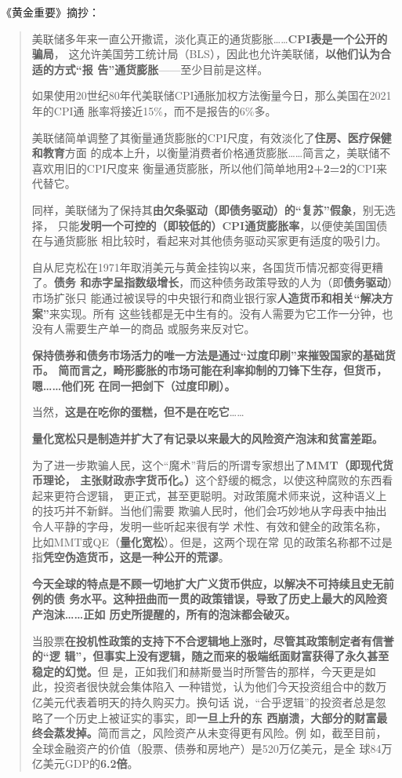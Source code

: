 《黄金重要》摘抄：
\begin{quotation}
  美联储多年来一直公开撒谎，淡化真正的通货膨胀……\textbf{CPI表是一个公开的骗局}，
  这允许美国劳工统计局（BLS），因此也允许美联储，\textbf{以他们认为合适的方式“报
    告”通货膨胀}——至少目前是这样。

  如果使用20世纪80年代美联储CPI通胀加权方法衡量今日，那么美国在2021年的CPI通
  胀率将接近15\%，而不是报告的6\%多。

  美联储简单调整了其衡量通货膨胀的CPI尺度，有效淡化了\textbf{住房、医疗保健和教育}方面
  的成本上升，以衡量消费者价格通货膨胀……简言之，美联储不喜欢用旧的CPI尺度来
  衡量通货膨胀，所以他们简单地用\textbf{2+2=2}的CPI来代替它。

  同样，美联储为了保持其\textbf{由欠条驱动（即债务驱动）的“复苏”假象}，别无选择，
  只能\textbf{发明一个可控的（即较低的）CPI通货膨胀率}，以便使美国国债在与通货膨胀
  相比较时，看起来对其他债务驱动买家更有适度的吸引力。

  自从尼克松在1971年取消美元与黄金挂钩以来，各国货币情况都变得更糟了。\textbf{债务
    和赤字呈指数级增长}，而这种债务政策导致的人为（即\textbf{债务驱动}）市场扩张只
  能通过被误导的中央银行和商业银行家\textbf{人造货币和相关“解决方案”}来实现。所有
  这些钱都是无中生有的。没有人需要为它工作一分钟，也没有人需要生产单一的商品
  或服务来反对它。

  \textbf{保持债券和债务市场活力的唯一方法是通过“过度印刷”来摧毁国家的基础货币。
    简而言之，畸形膨胀的市场可能在利率抑制的刀锋下生存，但货币，嗯……他们死
    在同一把剑下（过度印刷）。}

  当然，\textbf{这是在吃你的蛋糕，但不是在吃它}……


  \textbf{量化宽松只是制造并扩大了有记录以来最大的风险资产泡沫和贫富差距。}

  为了进一步欺骗人民，这个“魔术”背后的所谓专家想出了\textbf{MMT（即现代货币理论，
    主张财政赤字货币化。）}这个舒缓的概念，以使这种腐败的东西看起来更符合逻辑，
  更正式，甚至更聪明。对政策魔术师来说，这种语义上的技巧并不新鲜。当他们需要
  欺骗人民时，他们会巧妙地从字母表中抽出令人平静的字母，发明一些听起来很有学
  术性、有效和健全的政策名称，比如MMT或QE（\textbf{量化宽松}）。但是，这两个现在常
  见的政策名称都不过是指\textbf{凭空伪造货币，这是一种公开的荒谬}。

  \textbf{今天全球的特点是不顾一切地扩大广义货币供应，以解决不可持续且史无前例的债
    务水平。这种扭曲而一贯的政策错误，导致了历史上最大的风险资产泡沫……正如
  历史所提醒的，所有的泡沫都会破灭。}

  当股票\textbf{在投机性政策的支持下不合逻辑地上涨时，尽管其政策制定者有信誉的“逻
    辑”，但事实上没有逻辑，随之而来的极端纸面财富获得了永久甚至稳定的幻觉。}但
  是，正如我们和赫斯曼当时所警告的那样，今天更是如此，投资者很快就会集体陷入
  一种错觉，认为他们今天投资组合中的数万亿美元代表着明天的持久购买力。换句话
  说，“合乎逻辑”的投资者总是忽略了一个历史上被证实的事实，即\textbf{一旦上升的东
    西崩溃，大部分的财富最终会蒸发掉。}简而言之，风险资产从未变得更有风险。例
  如，截至目前，全球金融资产的价值（股票、债券和房地产）是520万亿美元，是全
  球84万亿美元GDP的\textbf{6.2倍}。


\end{quotation}
